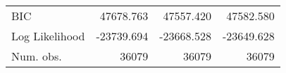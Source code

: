 \begin{center}
\begin{ThreePartTable}
\begin{tabularx}{\textwidth}{X D{.}{.}{6.6} D{.}{.}{6.6} D{.}{.}{6.6}}
BIC                               & 47678.763               & 47557.420               & 47582.580               \\
Log Likelihood                    & -23739.694              & -23668.528              & -23649.628              \\
Num. obs.                         & 36079                   & 36079                   & 36079                   \\
\end{tabularx}
\end{ThreePartTable}
\end{center}

